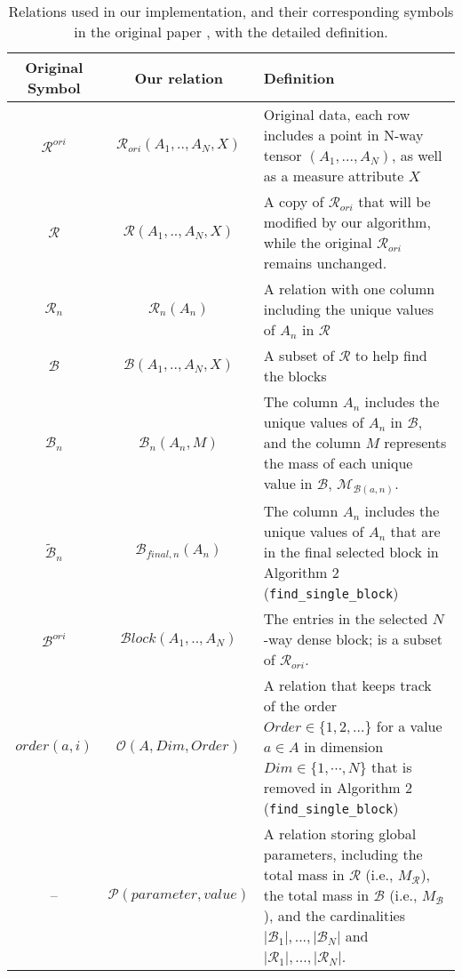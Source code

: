 \begin{table}[htbp]
\caption{Relations used in our implementation, and their corresponding symbols in the original paper \cite{shin2017d}, with the detailed definition. }
\label{tab:relation}

\begin{center}
\begin{tabular}{ c | c| p{3.7in}}
\hline
Original Symbol & Our relation & Definition \\
\hline
$\mathcal{R}^{ori}$ & $\mathcal{R}_{ori}(A_1, .., A_N, X)$ & Original data, each row includes a point in N-way tensor $(A_1, ..., A_N)$, as well as a measure attribute $X$ \\  
$\mathcal{R}$ & $\mathcal{R}(A_1, .., A_N, X)$ & A copy of $\mathcal{R}_{ori}$ that will be modified by our algorithm, while the original $\mathcal{R}_{ori}$ remains unchanged. \\
 $\mathcal{R}_n$ & $\mathcal{R}_n(A_n)$ & A relation with one column including the unique values of $A_n$ in $\mathcal{R}$ \\
$\mathcal{B}$ & $\mathcal{B}(A_1, .., A_N, X)$ & A subset of $\mathcal{R}$ to help find the blocks \\  
$\mathcal{B}_n$ & $\mathcal{B}_n(A_n, M)$ & The column $A_n$ includes the unique values of $A_n$ in $\mathcal{B}$, and the column $M$ represents the mass of each unique value in $\mathcal{B}$, $\mathcal{M}_{\mathcal{B}(a, n)}$. \\
$\tilde{\mathcal{B}}_n$ &  $\mathcal{B}_{final, n}(A_n)$ & The column $A_n$ includes the unique values of $A_n$ that are in the final selected block in Algorithm 2 ({\tt find\_single\_block})  \\
$\mathcal{B}^{ori}$ &   $\mathcal{B}lock (A_1, .., A_N)$ & The entries in the selected $N$-way dense block; is a subset of $\mathcal{R}_{ori}$. \\
$order(a, i)$ & $\mathcal{O}(A, Dim, Order)$ & A relation that keeps track of the order $Order \in \{1, 2, ...\}$ for a value $a \in A$ in dimension $Dim \in \{1, \cdots, N\}$ that is removed in Algorithm 2 ({\tt find\_single\_block}) \\ 
-- & $\mathcal{P}(parameter, value)$ & A relation storing global parameters, including the total mass in $\mathcal{R}$ (i.e., $M_{\mathcal{R}}$), 
 the total mass in $\mathcal{B}$ (i.e., $M_{\mathcal{B}}$), and the cardinalities $|\mathcal{B}_1|, ..., |\mathcal{B}_N|$ and $|\mathcal{R}_1|, ..., |\mathcal{R}_N|$.  \\
\hline
\end{tabular}
\end{center}

\end{table}%


